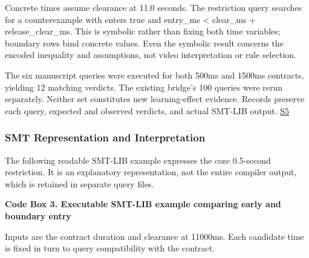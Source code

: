 \documentclass[nolineno]{ieeeaccess}
\begin{document}
Concrete times assume clearance at 11.0 seconds. The restriction query searches for a counterexample with {\ttfamily{}\selectfont\footnotesize enters} true and {\ttfamily{}\selectfont\footnotesize entry\_\allowbreak ms < clear\_\allowbreak ms + release\_\allowbreak clear\_\allowbreak ms}. This is symbolic rather than fixing both time variables; boundary rows bind concrete values. Even the symbolic result concerns the encoded inequality and assumptions, not video interpretation or rule selection.\par

The six manuscript queries were executed for both 500ms and 1500ms contracts, yielding 12 matching verdicts. The existing bridge's 100 queries were rerun separately. Neither set constitutes new learning-effect evidence. Records preserve each query, expected and observed verdicts, and actual SMT-LIB output. \href{\detokenize{projects/04-guardsynth-coc/artifacts/public/paper1-method-preservation-001/methodology-2026-09-30-001/manuscript_examples.json}}{S5}\par

\subsubsection{SMT Representation and Interpretation}

The following readable SMT-LIB example expresses the core 0.5-second restriction. It is an explanatory representation, not the entire compiler output, which is retained in separate query files.\par

\textbf{Code Box 3. Executable SMT-LIB example comparing early and boundary entry}\par

Inputs are the contract duration and clearance at 11000ms. Each candidate time is fixed in turn to query compatibility with the contract.\par
\end{document}
